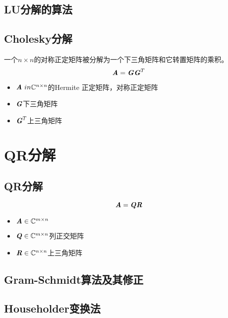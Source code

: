 \subsection{LU分解的算法}
\label{sub:LU分解的算法}

\subsection{Cholesky分解}
\label{sub:Cholesky分解}

\begin{definition}
    一个$n \times n$的对称正定矩阵被分解为一个下三角矩阵和它转置矩阵的乘积。
    $$
    \boldsymbol{\mathit{A}} = \boldsymbol{\mathit{G}} \boldsymbol{\mathit{G}}^T
    $$
    \begin{itemize}
        \item $\boldsymbol{\mathit{A}} \ in \mathbb{C}^{n \times n}$的Hermite 正定矩阵，对称正定矩阵
        \item $\boldsymbol{\mathit{G}}$下三角矩阵
        \item $\boldsymbol{\mathit{G}}^T$上三角矩阵
    \end{itemize}
\end{definition}

\section{QR分解}
\label{sec:QR分解}

\subsection{QR分解}
\label{sub:QR分解}

\begin{definition}[QR分解]
    $$
    \boldsymbol{\mathit{A}} = \boldsymbol{\mathit{Q}} \boldsymbol{\mathit{R}}
    $$
    \begin{itemize}
        \item $\boldsymbol{\mathit{A}} \in \mathbb{C}^{m \times n}$
        \item $\boldsymbol{\mathit{Q}} \in \mathbb{C}^{m \times n}$列正交矩阵
        \item $\boldsymbol{\mathit{R}} \in \mathbb{C}^{n \times n}$上三角矩阵
    \end{itemize}
\end{definition}

\subsection{Gram-Schmidt算法及其修正}
\label{sub:Gram-Schmidt算法及其修正}

\subsection{Householder变换法}
\label{sub:Householder变换法}

